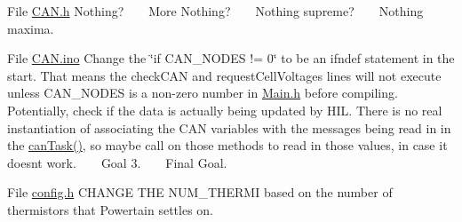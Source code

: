 
\begin{DoxyRefList}
\item[File \mbox{\hyperlink{_c_a_n_8h}{CAN.h}} ]\label{todo__todo000001}%
%
 Nothing? ~\newline
 ~\newline
 More Nothing? ~\newline
 ~\newline
 Nothing supreme? ~\newline
 ~\newline
 Nothing maxima.  
\item[File \mbox{\hyperlink{_c_a_n_8ino}{CAN.ino}} ]\label{todo__todo000002}%
%
 Change the \char`\"{}if CAN\+\_\+\+NODES != 0\char`\"{} to be an ifndef statement in the start. That means the check\+CAN and request\+Cell\+Voltages lines will not execute unless CAN\+\_\+\+NODES is a non-\/zero number in \mbox{\hyperlink{_main_8h}{Main.\+h}} before compiling. ~\newline
 ~\newline
 Potentially, check if the data is actually being updated by HIL. There is no real instantiation of associating the CAN variables with the messages being read in in the \mbox{\hyperlink{_c_a_n_8h_a785e095da30ce4993a186804102bf2ea}{can\+Task()}}, so maybe call on those methods to read in those values, in case it doesnt work. ~\newline
 ~\newline
 Goal 3. ~\newline
 ~\newline
 Final Goal.  
\item[File \mbox{\hyperlink{config_8h}{config.h}} ]\label{todo__todo000003}%
%
 CHANGE THE NUM\+\_\+\+THERMI based on the number of thermistors that Powertain settles on. ~\newline
 ~\newline
  

\end{DoxyRefList}
